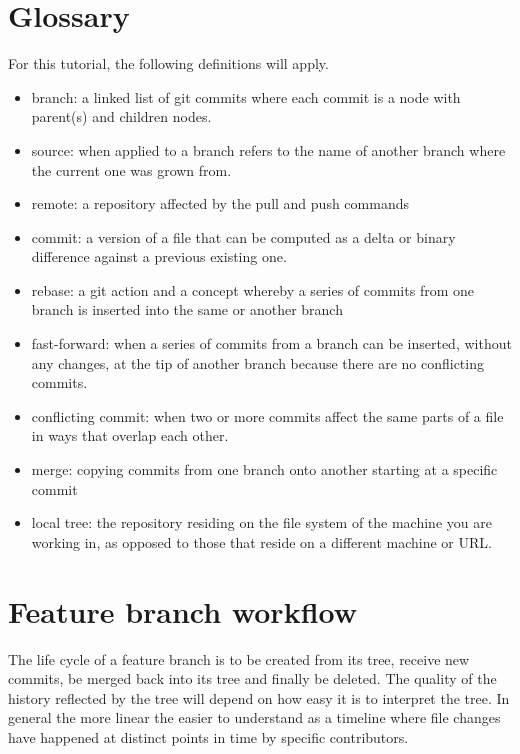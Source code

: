 \documentclass[10pt]{article}
\begin{document}
\section{Glossary}

For this tutorial, the following definitions will apply.

\begin{itemize}
    \item branch: a linked list of git commits where each commit is a node with parent(s) and children nodes.
    \item source: when applied to a branch refers to the name of another branch where the current one was grown from.
    \item remote: a repository affected by the pull and push commands 
    \item commit: a version of a file that can be computed as a delta or binary difference against a previous existing one.
    \item rebase: a git action and a concept whereby a series of commits from one branch is inserted into the same or another branch
    \item fast-forward: when a series of commits from a branch can be inserted, without any changes, at the tip of another branch because there are no conflicting commits.
    \item conflicting commit: when two or more commits affect the same parts of a file in ways that overlap each other.  
    \item merge: copying commits from one branch onto another starting at a specific commit
    \item local tree: the repository residing on the file system of the machine you are working in, as opposed to those that reside on a different machine or URL.
\end{itemize}

\section{Feature branch workflow}

The life cycle of a feature branch is to be created from its tree, receive new commits, be merged back into its tree and finally be deleted.
The quality of the history reflected by the tree will depend on how easy it is to interpret the tree.
In general the more linear the easier to understand as a timeline where file changes have happened at distinct points in time by specific contributors.
\end{document}
